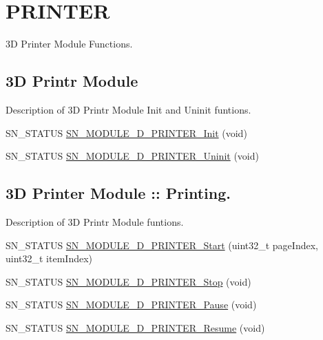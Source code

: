 \hypertarget{group__PRINTER}{}\section{P\+R\+I\+N\+T\+ER}
\label{group__PRINTER}


3D Printer Module Functions.  


\subsection*{3D Printr Module}
\label{_amgrp31919ac2a63e9801f2c4fb221e60d48f}%
Description of 3D Printr Module Init and Uninit funtions. \begin{DoxyCompactItemize}
\item 
S\+N\+\_\+\+S\+T\+A\+T\+US \hyperlink{group__PRINTER_ga801e265ffe6f8c56081112f4fdd35f39}{S\+N\+\_\+\+M\+O\+D\+U\+L\+E\+\_\+D\+\_\+\+P\+R\+I\+N\+T\+E\+R\+\_\+\+Init} (void)
\item 
S\+N\+\_\+\+S\+T\+A\+T\+US \hyperlink{group__PRINTER_ga776f5e31b0c0e176e35669f9432baec0}{S\+N\+\_\+\+M\+O\+D\+U\+L\+E\+\_\+D\+\_\+\+P\+R\+I\+N\+T\+E\+R\+\_\+\+Uninit} (void)
\end{DoxyCompactItemize}
\subsection*{3D Printer Module \+:\+: Printing.}
\label{_amgrpc4945650ed87e7ed89ffb690e375bfb1}%
Description of 3D Printr Module funtions. \begin{DoxyCompactItemize}
\item 
S\+N\+\_\+\+S\+T\+A\+T\+US \hyperlink{group__PRINTER_ga439ebb10f8ee839218655c5177e9110b}{S\+N\+\_\+\+M\+O\+D\+U\+L\+E\+\_\+D\+\_\+\+P\+R\+I\+N\+T\+E\+R\+\_\+\+Start} (uint32\+\_\+t page\+Index, uint32\+\_\+t item\+Index)
\item 
S\+N\+\_\+\+S\+T\+A\+T\+US \hyperlink{group__PRINTER_ga21ca69a451fafe2c9218c9a1737e1f15}{S\+N\+\_\+\+M\+O\+D\+U\+L\+E\+\_\+D\+\_\+\+P\+R\+I\+N\+T\+E\+R\+\_\+\+Stop} (void)
\item 
S\+N\+\_\+\+S\+T\+A\+T\+US \hyperlink{group__PRINTER_ga84a03238ddc0021011c12839757bf8c2}{S\+N\+\_\+\+M\+O\+D\+U\+L\+E\+\_\+D\+\_\+\+P\+R\+I\+N\+T\+E\+R\+\_\+\+Pause} (void)
\item 
S\+N\+\_\+\+S\+T\+A\+T\+US \hyperlink{group__PRINTER_gaabec8b5f01119d989d725eff26053ca5}{S\+N\+\_\+\+M\+O\+D\+U\+L\+E\+\_\+D\+\_\+\+P\+R\+I\+N\+T\+E\+R\+\_\+\+Resume} (void)
\end{DoxyCompactItemize}
